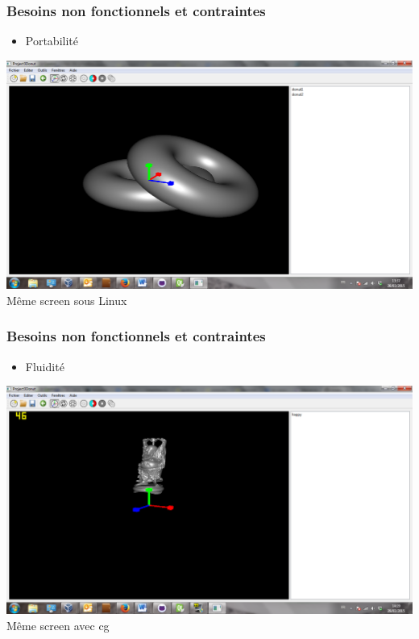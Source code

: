 \documentclass{beamer}
\begin{document}

\begin{frame}
\frametitle{Besoins non fonctionnels et contraintes}
\begin{itemize}[label=$\bullet$]
\item Portabilité
\end{itemize}
\centering
\includegraphics[scale=0.7]{portabilite.png}
\\
Même screen sous Linux 

\end{frame}


\begin{frame}
\frametitle{Besoins non fonctionnels et contraintes}
\begin{itemize}[label=$\bullet$]
\item Fluidité
\end{itemize}
\centering
\includegraphics[scale=0.7]{fluidite.png}
\\
Même screen avec cg 

\end{frame}
\end{document}
